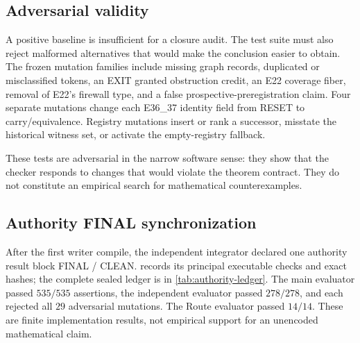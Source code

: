 \subsection{Adversarial validity}

A positive baseline is insufficient for a closure audit.  The test suite must
also reject malformed alternatives that would make the conclusion easier to
obtain.  The frozen mutation families include missing graph records, duplicated
or misclassified tokens, an EXIT granted obstruction credit, an E22 coverage
fiber, removal of E22's firewall type, and a false prospective-preregistration
claim.  Four separate mutations change each E36\_37 identity field from RESET
to carry/equivalence.  Registry mutations insert or rank a successor, misstate
the historical witness set, or activate the empty-registry fallback.

These tests are adversarial in the narrow software sense: they show that the
checker responds to changes that would violate the theorem contract.  They do
not constitute an empirical search for mathematical counterexamples.

\subsection{Authority FINAL synchronization}

After the first writer compile, the independent integrator declared one
authority result block FINAL / CLEAN.   records its
principal executable checks and exact hashes; the complete sealed ledger is in
\cref{tab:authority-ledger}.  The main evaluator passed $535/535$ assertions,
the independent evaluator passed $278/278$, and each rejected all $29$
adversarial mutations.  The Route evaluator passed $14/14$.  These are finite
implementation results, not empirical support for an unencoded mathematical
claim.

